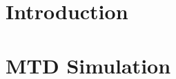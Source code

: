 \documentclass[oneside,12pt,final]{sty/ucthesis-CA2012}
\begin{document}
\begin{frontmatter}
	
	\maketitle
	\approvalpage
	\copyrightpage
% 	
	
% 	
	
	\tableofcontents
\end{frontmatter}

\begin{mainmatter}

\pagestyle{fancy}
\renewcommand{\chaptermark}[1]{\markboth{{\sf #1 \hspace*{\fill} Chapter~\thechapter}}{} }
\renewcommand{\sectionmark}[1]{\markright{ {\sf Section~\thesection \hspace*{\fill} #1 }}}
\fancyhf{}

\makeatletter \if@twoside \fancyhead[LO]{\small \rightmark} \fancyhead[RE]{\small\leftmark} \else \fancyhead[LO]{\small\leftmark}
\fancyhead[RE]{\small\rightmark} \fi

\def\cleardoublepage{\clearpage\if@openright \ifodd\c@page\else
  \hbox{}
  \vspace*{\fill}
  \begin{center}
    This page intentionally left blank
  \end{center}
  \vspace{\fill}
  \thispagestyle{plain}
  \newpage
  \fi \fi}
\makeatother
\fancyfoot[c]{\textrm{\textup{\thepage}}} %
\fancyfoot[C]{\thepage}
\renewcommand{\headrulewidth}{0.4pt}

 { \fancyhf{} \fancyfoot[C]{\thepage}
\renewcommand{\headrulewidth}{0pt}
\renewcommand{\footrulewidth}{0pt}}

\chapter{Introduction}


\chapter{MTD Simulation}



\end{mainmatter}
\end{document}
